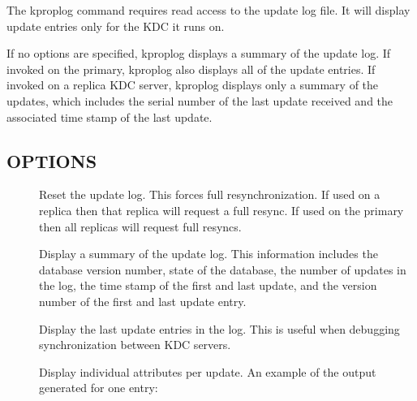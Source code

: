 \documentclass[letterpaper,10pt,english]{sphinxmanual}
\begin{document}
\sphinxAtStartPar
The kproplog command requires read access to the update log file.  It
will display update entries only for the KDC it runs on.

\sphinxAtStartPar
If no options are specified, kproplog displays a summary of the update
log.  If invoked on the primary, kproplog also displays all of the
update entries.  If invoked on a replica KDC server, kproplog displays
only a summary of the updates, which includes the serial number of the
last update received and the associated time stamp of the last update.


\subsection{OPTIONS}
\label{\detokenize{admin/admin_commands/kproplog:options}}\begin{description}
\item[{}] \leavevmode
\sphinxAtStartPar
Reset the update log.  This forces full resynchronization.  If
used on a replica then that replica will request a full resync.
If used on the primary then all replicas will request full
resyncs.

\item[{}] \leavevmode
\sphinxAtStartPar
Display a summary of the update log.  This information includes
the database version number, state of the database, the number of
updates in the log, the time stamp of the first and last update,
and the version number of the first and last update entry.

\item[{ }] \leavevmode
\sphinxAtStartPar
Display the last  update entries in the log.  This is useful
when debugging synchronization between KDC servers.

\item[{}] \leavevmode
\sphinxAtStartPar
Display individual attributes per update.  An example of the
output generated for one entry:

\begin{sphinxVerbatim}[commandchars=\\\{\}]
 
     
      
      
      
      
           
      
          
           
          
          
          
\end{sphinxVerbatim}


\end{description}
\end{document}
